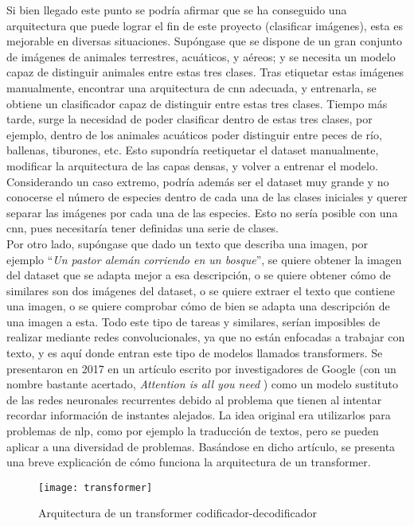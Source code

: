 			Si bien llegado este punto se podría afirmar que se ha conseguido una arquitectura que puede lograr el fin de este proyecto (clasificar imágenes), esta es mejorable en diversas situaciones. Supóngase que se dispone de un gran conjunto de imágenes de animales terrestres, acuáticos, y aéreos; y se necesita un modelo capaz de distinguir animales entre estas tres clases. Tras etiquetar estas imágenes manualmente, encontrar una arquitectura de \gls{cnn} adecuada, y entrenarla, se obtiene un clasificador capaz de distinguir entre estas tres clases. Tiempo más tarde, surge la necesidad de poder clasificar dentro de estas tres clases, por ejemplo, dentro de los animales acuáticos poder distinguir entre peces de río, ballenas, tiburones, etc. Esto supondría reetiquetar el dataset manualmente, modificar la arquitectura de las capas densas, y volver a entrenar el modelo. Considerando un caso extremo, podría además ser el dataset muy grande y no conocerse el número de especies dentro de cada una de las clases iniciales y querer separar las imágenes por cada una de las especies. Esto no sería posible con una \gls{cnn}, pues necesitaría tener definidas una serie de clases. \\
			
			Por otro lado, supóngase que dado un texto que describa una imagen, por ejemplo ``\textit{Un pastor alemán corriendo en un bosque}'', se quiere obtener la imagen del dataset que se adapta mejor a esa descripción, o se quiere obtener cómo de similares son dos imágenes del dataset, o se quiere extraer el texto que contiene una imagen, o se quiere comprobar cómo de bien se adapta una descripción de una imagen a esta. Todo este tipo de tareas y similares, serían imposibles de realizar mediante redes convolucionales, ya que no están enfocadas a trabajar con texto, y es aquí donde entran este tipo de modelos llamados transformers. Se presentaron en 2017 en un artículo escrito por investigadores de Google (con un nombre bastante acertado, \textit{Attention is all you need} \cite{attention}) como un modelo sustituto de las redes neuronales recurrentes debido al problema que tienen al intentar recordar información de instantes alejados. La idea original era utilizarlos para problemas de \gls{nlp}, como por ejemplo la traducción de textos, pero se pueden aplicar a una diversidad de problemas. Basándose en dicho artículo, se presenta una breve explicación de cómo funciona la arquitectura de un transformer. \\
			
			\begin{figure}[!h]
				\centering
				\texttt{[image: transformer]}
				\caption{Arquitectura de un transformer codificador-decodificador \cite{attention}}
				\label{fig:arq_transf}
			\end{figure}
			
